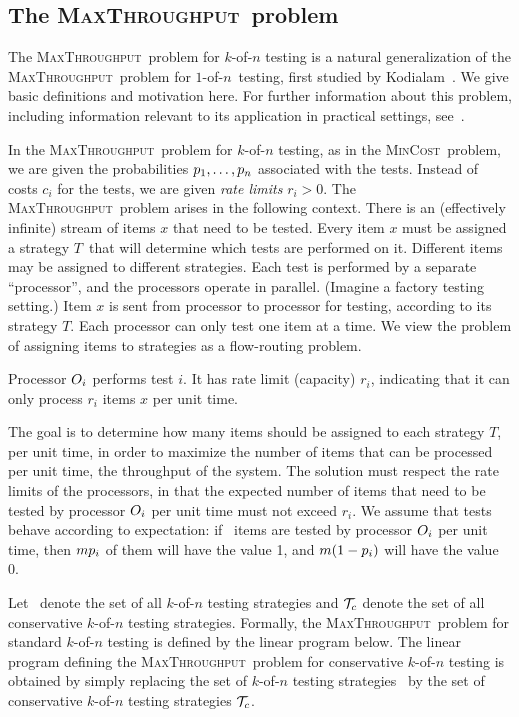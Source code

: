 \documentclass{article}
\newcounter{ass}
\newcommand{\ens}[1]{\ensuremath{#1}}					\newcommand{\card}[1]{\ens{|#1|}}							\newcommand{\dotlist}[2]{\ens{#1,\ldots,#2}}
\newcommand{\anitem}{\ens{x}}
\newcommand{\valn}{\ens{n}}
\newcommand{\valk}{\ens{k}}
\newcommand{\maxthru}{\textsc{MaxThroughput}}
\newcommand{\mincost}{\textsc{MinCost}}
\newcommand{\kofn}{\valk-of-\valn}
\newcommand{\oneofn}{$1$-of-\valn}
\newcommand{\strategy}{\ens{T}}
\newcommand{\processor}{processor}
\newcommand{\Processor}{Processor}
\newcommand{\test}[1]{\ens{#1}}										\newcommand{\cost}[1]{\ens{c_{#1}}}								\newcommand{\rate}[1]{\ens{r_{#1}}}								\newcommand{\resrate}[1]{\ens{r'_{#1}}}							\newcommand{\landprob}[2]{\ens{g(#1,#2)}}					\newcommand{\cstrat}[2]{\ens{\strategy^c_{#1}(#2)}}				\newcommand{\sstrat}[2]{\ens{\strategy^s_{#1}(#2)}}				\newcommand{\varz}[1]{\ens{z_{#1}}}								\newcommand{\vary}[1]{\ens{y_{#1}}}
\begin{document}
\subsection{The \maxthru\ problem}

The \maxthru\ problem for \kofn{} testing
is a natural generalization of the 
\maxthru\ problem for
\oneofn\ testing,
first studied by Kodialam~\cite{conf/ipco/Kodialam01}. 
We give basic definitions and motivation here.
For further information about this problem, including
information relevant to its application in practical settings, 
see~\cite{conf/ipco/Kodialam01,conf/pods/CondonDHW06,journals/talg/CondonDHW09}.

In the \maxthru\ problem for \kofn{} testing, as in the \mincost\ problem, 
we are given the probabilities
$\pr 1, \ldots, \pr{\valn}$ associated with the tests.
Instead of costs $\cost i$ for the tests, we are given
{\em rate limits} $\rate i > 0$.
The \maxthru\ problem arises in the following context.
There is an (effectively infinite) stream of items \anitem{} that need to be tested.
Every item \anitem{} must be assigned a strategy \strategy\ that will
determine which tests are performed on it.
Different items may be assigned to different strategies.
Each test is performed by a separate ``{\processor}'', and the {\processor}s operate in parallel.
(Imagine a factory testing setting.)
Item \anitem{} is sent from {\processor} to {\processor} for testing, 
according to its strategy \strategy.
Each {\processor} can only test one item at a time.
We view the problem of assigning items to strategies as
a flow-routing problem.

{\Processor} $\op{i}$ performs test $\test i$.  It has rate limit (capacity) $\rate i$, indicating
that it can only
process $\rate i$ items \anitem{} per unit time. 


The goal is to determine how many items should be assigned to each strategy \strategy,
per unit time, in order to maximize 
the number of items that can be processed per unit time, the throughput of the system.
The solution must respect the rate limits of the {\processor}s, in that the
expected number of items that need to be tested by {\processor} $\op i$ per unit time must
not exceed $\rate i$.  
We assume that tests behave according to expectation: if \flowamt\ items
are tested by {\processor} $\op i$ per unit time, then $\flowamt\pr i$ of them will have the value 1,
and $\flowamt(1-\pr i)$ will have the value 0.

Let \stratspace\ denote the set of all \kofn{} testing strategies and
$\stratspacec$ denote the set of all conservative \kofn{} testing strategies. 
Formally, the \maxthru\ problem for standard \kofn{}
testing is defined by the linear program below.
The linear program defining the \maxthru\ problem for conservative \kofn{} testing is obtained 
by simply replacing the set of \kofn{} testing strategies \stratspace\ by the
set of conservative \kofn{} testing strategies $\stratspacec$.
\end{document}
